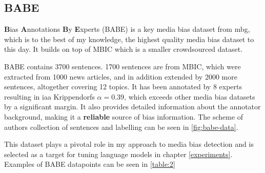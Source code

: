 \subsection{BABE}
\textbf{B}ias \textbf{A}nnotations \textbf{B}y \textbf{E}xperts (BABE) is a key media bias dataset from \Gls{mbg}, which is to the best of my knowledge, the highest quality media bias dataset to this day. It builds on top of MBIC \cite{Spinde2021MBIC} which is a smaller crowdsourced dataset.

BABE contains 3700 sentences. 1700 sentences are from MBIC, which were extracted from 1000 news articles, and in addition extended by 2000 more sentences, altogether covering 12 topics. It has been annotated by 8 experts resulting in \gls{iaa} Krippendorfs $\alpha = 0.39$, which exceeds other media bias datasets by a significant margin. It also provides detailed information about the annotator background, making it a \textbf{reliable} source of bias information. The scheme of authors collection of sentences and labelling can be seen in \ref{fig:babe-data}.

This dataset plays a pivotal role in my approach to media bias detection and is selected as a target for tuning language models in chapter \ref{experiments}. Examples of BABE datapoints can be seen in \ref{table:2}
\begin{table}

\caption{Example of biased and unbiased sentences from \textbf{BABE}}
\label{table:2}
\end{table}


